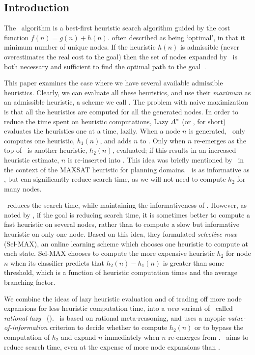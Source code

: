 \subsection{Introduction}


The \astar~algorithm \cite{ASTR68} is a best-first heuristic search
algorithm guided by the cost function $f(n)=g(n)+h(n)$. %
often described as being `optimal', in that it %
minimum number of unique nodes.  If the heuristic $h(n)$ is admissible (never
overestimates the real cost to the goal) then the set of nodes expanded
by \astar~is both necessary and sufficient to find the optimal path
to the goal~\cite{ASTR85}.

This paper examines the case where we have several available admissible
heuristics. Clearly, we can evaluate all these heuristics, and use their {\em
maximum} as an admissible heuristic, a scheme we call \astarmax.
The problem with naive maximization is that all the heuristics are
computed for all the generated nodes.
In order to reduce the time spent on heuristic computations, Lazy $A^\ast$ (or
\lazyastar, for short) evaluates the heuristics one at a time, lazily. When a node $n$ is
generated, \lazyastar~only computes one heuristic, $h_1(n)$, and adds $n$ to
\OPEN.  Only when $n$ re-emerges as the top of \OPEN~is another heuristic, $h_2(n)$,
evaluated; if this results in an increased heuristic estimate, $n$ is
re-inserted into \OPEN.  This idea was briefly mentioned by~\cite{zhang-bacchus:aaai-2012} in the
context of the MAXSAT heuristic for planning domains.
\lazyastar~is as informative as \astarmax, but can significantly reduce
search time, as we will not need to compute $h_2$ for many nodes.

\lazyastar~reduces the search time, while maintaining the informativeness of \astarmax.
However, as noted by \cite{domshlak-et-al:jair-2012},  if the goal is reducing
search time, it is sometimes better to compute a fast heuristic on
several nodes, rather than to compute a slow but informative heuristic on only one
node.
Based on this idea, they formulated {\em selective max} (Sel-MAX), an online
learning scheme which chooses one heuristic to compute at each
state. Sel-MAX chooses to compute the more expensive heuristic $h_2$ for
node $n$ when its classifier predicts that $h_2(n) - h_1(n)$ is greater than
some threshold, which is a function of heuristic computation times and the average
branching factor.

We combine the ideas of lazy heuristic evaluation and of trading off more node expansions
for less heuristic computation time, into a {\em new} variant of \lazyastar~called
{\em rational lazy} \astar~(\rationallazyastar).
\rationallazyastar~is based on rational meta-reasoning, and uses a myopic {\em
value-of-information} criterion to decide whether to compute $h_2(n)$ or to
bypass the computation of $h_2$ and expand $n$ immediately when $n$ re-emerges
from \OPEN. \rationallazyastar~aims to reduce search time, even at the expense of
more node expansions than \astarmax.

